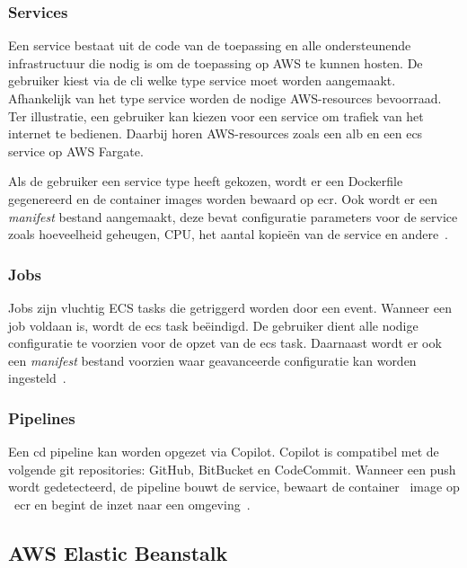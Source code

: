 \subsubsection{Services}

Een service bestaat uit de code van de toepassing en alle ondersteunende infrastructuur die nodig is om de toepassing op AWS te kunnen hosten.
De gebruiker kiest via de \acrshort{cli} welke type service moet worden aangemaakt.
Afhankelijk van het type service worden de nodige AWS-resources bevoorraad.
Ter illustratie, een gebruiker kan kiezen voor een service om trafiek van het internet te bedienen.
Daarbij horen AWS-resources zoals een \acrfull{alb} en een \acrshort{ecs} service op AWS Fargate.

Als de gebruiker een service type heeft gekozen, wordt er een Dockerfile gegenereerd en de container \glspl{image} worden bewaard op \acrfull{ecr}.
Ook wordt er een \emph{manifest} bestand aangemaakt, deze bevat configuratie parameters voor de service zoals hoeveelheid geheugen, CPU, het aantal kopieën van de service en andere~\autocite{Karakus2022}.

\subsubsection{Jobs}

Jobs zijn vluchtig ECS tasks die getriggerd worden door een event.
Wanneer een job voldaan is, wordt de \acrshort{ecs} task beëindigd.
De gebruiker dient alle nodige configuratie te voorzien voor de opzet van de \acrshort{ecs} task.
Daarnaast wordt er ook een \emph{manifest} bestand voorzien waar geavanceerde configuratie kan worden ingesteld~\autocite{Karakus2022}.

\subsubsection{Pipelines}

Een \acrfull{cd} pipeline kan worden opgezet via Copilot.
Copilot is compatibel met de volgende git repositories: GitHub, BitBucket en CodeCommit.
Wanneer een push wordt gedetecteerd, de pipeline bouwt de service, bewaart de container ~\gls{image} op ~\acrshort{ecr} en begint de inzet naar een omgeving~\autocite{Karakus2022}.

\subsection{AWS Elastic Beanstalk}
\label{subsec:service-elastic-beanstalk}

